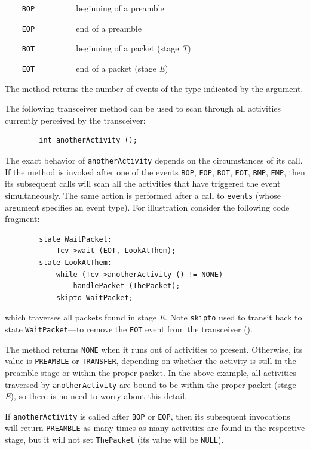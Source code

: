 \bigskip

\noindent
{\tt ~~~~BOP~~~~~~~~~} beginning of a preamble

\noindent
{\tt ~~~~EOP~~~~~~~~~} end of a preamble

\noindent
{\tt ~~~~BOT~~~~~~~~~} beginning of a packet (stage {\em T\/})

\noindent
{\tt ~~~~EOT~~~~~~~~~} end of a packet (stage {\em E\/})

\bigskip

\noindent
The method returns the number of events of the type indicated by the
argument.

The following transceiver method can be used to scan through all activities
currently perceived by the transceiver:
\begin{verbatim}
        int anotherActivity ();
\end{verbatim}
\noindent
The exact behavior of {\tt anotherActivity} depends on the circumstances of
its call.
If the method is invoked after one of the events {\tt BOP}, {\tt EOP},
{\tt BOT}, {\tt EOT}, {\tt BMP}, {\tt EMP},
then its subsequent calls will scan all the activities that have
triggered the event simultaneously.
The same action is performed after a call to {\tt events} (whose argument
specifies an event type).
For illustration consider the following code fragment:
\begin{verbatim}
        state WaitPacket:
            Tcv->wait (EOT, LookAtThem);
        state LookAtThem:
            while (Tcv->anotherActivity () != NONE)
                handlePacket (ThePacket);
            skipto WaitPacket;
\end{verbatim}
\noindent
which traverses all packets found in stage {\em E}.
Note {\tt skipto} used to transit back to state {\tt WaitPacket}---to 
remove the {\tt EOT} event from the transceiver ().

The method returns {\tt NONE} when it runs out of activities to present.
Otherwise, its value is
{\tt PREAMBLE} or {\tt TRANSFER}, depending on whether the activity is still
in the preamble stage or within the proper packet.
In the above example, all activities traversed by {\tt anotherActivity} are
bound to be within the proper packet (stage {\em E\/}), so there is no
need to worry about this detail.

If {\tt anotherActivity} is called after {\tt BOP} or {\tt EOP},
then its subsequent invocations
will return {\tt PREAMBLE} as many times as many activities are found in the
respective stage, but it will not set {\tt ThePacket} (its value will be
{\tt NULL}).

